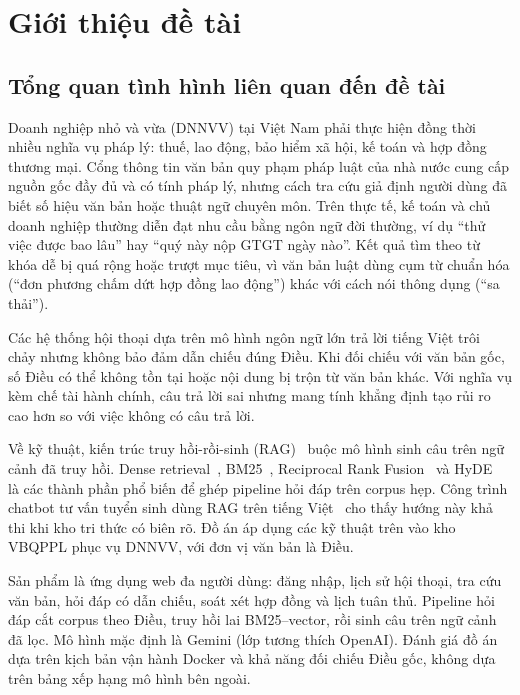 \setcounter{page}{1}

\chapter{Giới thiệu đề tài}

\section{Tổng quan tình hình liên quan đến đề tài}

Doanh nghiệp nhỏ và vừa (DNNVV) tại Việt Nam phải thực hiện đồng thời nhiều
nghĩa vụ pháp lý: thuế, lao động, bảo hiểm xã hội, kế toán và hợp đồng thương
mại. Cổng thông tin văn bản quy phạm pháp luật của nhà nước cung cấp nguồn gốc
đầy đủ và có tính pháp lý, nhưng cách tra cứu giả định người dùng đã biết số
hiệu văn bản hoặc thuật ngữ chuyên môn. Trên thực tế, kế toán và chủ doanh nghiệp
thường diễn đạt nhu cầu bằng ngôn ngữ đời thường, ví dụ ``thử việc được bao lâu''
hay ``quý này nộp GTGT ngày nào''. Kết quả tìm theo từ khóa dễ bị quá rộng hoặc
trượt mục tiêu, vì văn bản luật dùng cụm từ chuẩn hóa (``đơn phương chấm dứt hợp
đồng lao động'') khác với cách nói thông dụng (``sa thải'').

Các hệ thống hội thoại dựa trên mô hình ngôn ngữ lớn trả lời tiếng Việt trôi chảy
nhưng không bảo đảm dẫn chiếu đúng Điều. Khi đối chiếu với văn bản gốc, số Điều
có thể không tồn tại hoặc nội dung bị trộn từ văn bản khác. Với nghĩa vụ kèm chế
tài hành chính, câu trả lời sai nhưng mang tính khẳng định tạo rủi ro cao hơn so
với việc không có câu trả lời.

Về kỹ thuật, kiến trúc truy hồi-rồi-sinh (RAG)~\cite{lewis2020rag} buộc mô hình
sinh câu trên ngữ cảnh đã truy hồi. Dense retrieval~\cite{karpukhin2020dpr},
BM25~\cite{robertson2009bm25}, Reciprocal Rank Fusion~\cite{cormack2009rrf} và
HyDE~\cite{gao2023hyde} là các thành phần phổ biến để ghép pipeline hỏi đáp trên
corpus hẹp. Công trình chatbot tư vấn tuyển sinh dùng RAG trên tiếng
Việt~\cite{duong2026} cho thấy hướng này khả thi khi kho tri thức có biên rõ.
Đồ án áp dụng các kỹ thuật trên vào kho VBQPPL phục vụ DNNVV, với đơn vị văn bản
là Điều.



Sản phẩm là ứng dụng web đa người dùng: đăng nhập, lịch sử hội thoại, tra cứu
văn bản, hỏi đáp có dẫn chiếu, soát xét hợp đồng và lịch tuân thủ. Pipeline hỏi
đáp cắt corpus theo Điều, truy hồi lai BM25--vector, rồi sinh câu trên ngữ cảnh
đã lọc. Mô hình mặc định là Gemini (lớp tương thích OpenAI). Đánh giá đồ án dựa
trên kịch bản vận hành Docker và khả năng đối chiếu Điều gốc, không dựa trên
bảng xếp hạng mô hình bên ngoài.

